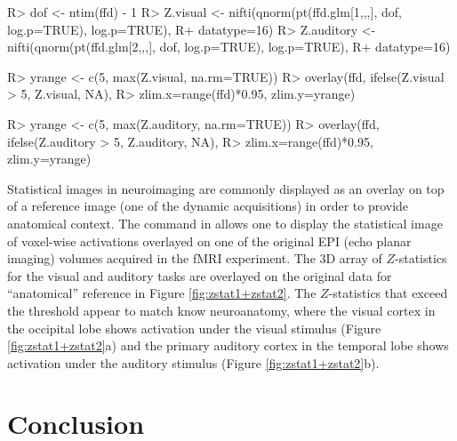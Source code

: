 \documentclass[
]{article}
\begin{document}
\begin{CodeChunk}

\begin{CodeInput}
R> dof <- ntim(ffd) - 1
R> Z.visual <- nifti(qnorm(pt(ffd.glm[1,,,], dof, log.p=TRUE), log.p=TRUE),
R+                   datatype=16)
R> Z.auditory <- nifti(qnorm(pt(ffd.glm[2,,,], dof, log.p=TRUE), log.p=TRUE),
R+                     datatype=16)
\end{CodeInput}
\end{CodeChunk}

\begin{CodeChunk}

\begin{CodeInput}
R> yrange <- c(5, max(Z.visual, na.rm=TRUE))
R> overlay(ffd, ifelse(Z.visual > 5, Z.visual, NA), 
R>         zlim.x=range(ffd)*0.95, zlim.y=yrange)
\end{CodeInput}
\end{CodeChunk}

\begin{CodeChunk}

\begin{CodeInput}
R> yrange <- c(5, max(Z.auditory, na.rm=TRUE))
R> overlay(ffd, ifelse(Z.auditory > 5, Z.auditory, NA), 
R>         zlim.x=range(ffd)*0.95, zlim.y=yrange)
\end{CodeInput}
\end{CodeChunk}

Statistical images in neuroimaging are commonly displayed as an overlay
on top of a reference image (one of the dynamic acquisitions) in order
to provide anatomical context. The  command in
 allows one to display the statistical image of
voxel-wise activations overlayed on one of the original EPI (echo planar
imaging) volumes acquired in the fMRI experiment. The 3D array of
\(Z\)-statistics for the visual and auditory tasks are overlayed on the
original data for ``anatomical'' reference in Figure
\ref{fig:zstat1+zstat2}. The \(Z\)-statistics that exceed the threshold
appear to match know neuroanatomy, where the visual cortex in the
occipital lobe shows activation under the visual stimulus (Figure
\ref{fig:zstat1+zstat2}a) and the primary auditory cortex in the
temporal lobe shows activation under the auditory stimulus (Figure
\ref{fig:zstat1+zstat2}b).

\section{Conclusion}
\end{document}
